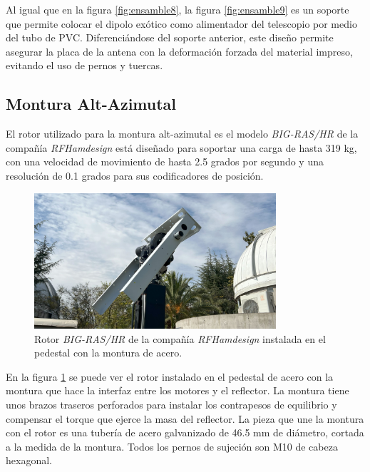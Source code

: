 Al igual que en la figura \ref{fig:ensamble8}, la figura \ref{fig:ensamble9} es un soporte que permite colocar el dipolo exótico como alimentador del telescopio por medio del tubo de PVC. Diferenciándose del soporte anterior, este diseño permite asegurar la placa de la antena con la deformación forzada del material impreso, evitando el uso de pernos y tuercas.\\

\subsection{Montura Alt-Azimutal}

El rotor utilizado para la montura alt-azimutal es el modelo \textit{BIG-RAS/HR} de la compañía \textit{RFHamdesign} está diseñado para soportar una carga de hasta 319 kg, con una velocidad de movimiento de hasta 2.5 grados por segundo y una resolución de 0.1 grados para sus codificadores de posición.\\

\begin{figure}
    \centering
    \includegraphics[width=0.8\textwidth]{img/soporte_montura}
    \caption{Rotor \textit{BIG-RAS/HR} de la compañía \textit{RFHamdesign} instalada en el pedestal con la montura de acero.}
    \label{fig:ensamble10}
\end{figure}

En la figura \ref{fig:ensamble10} se puede ver el rotor instalado en el pedestal de acero con la montura que hace la interfaz entre los motores y el reflector. La montura tiene unos brazos traseros perforados para instalar los contrapesos de equilibrio y compensar el torque que ejerce la masa del reflector. La pieza que une la montura con el rotor es una tubería de acero galvanizado de 46.5 mm de diámetro, cortada a la medida de la montura. Todos los pernos de sujeción son M10 de cabeza hexagonal.\\

